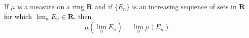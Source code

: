 If $\mu$ is a measure on a ring $\mathbf{R}$ and if $\{E_n\}$ is an increasing sequence of sets in $\mathbf{R}$ for which $\lim_n E_n \in \mathbf{R}$, then
$$\mu(\lim_n E_n) = \lim_n \mu(E_n).$$
